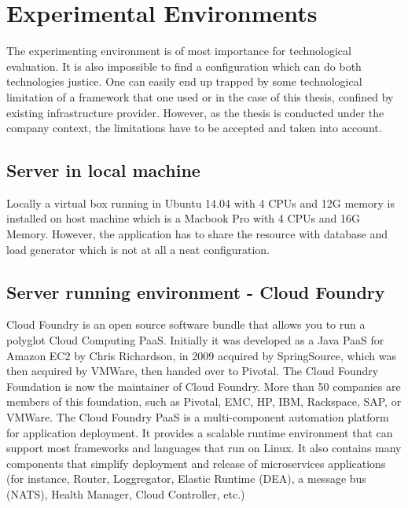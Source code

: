 \chapter{Experimental Environments}

The experimenting environment is of most importance for technological evaluation. It is also impossible to find a configuration which can do both technologies justice. One can easily end up trapped by some technological limitation of a framework that one used or in the case of this thesis, confined by existing infrastructure provider. However, as the thesis is conducted under the company context, the limitations have to be accepted and taken into account. 

\section{Server in local machine}
Locally a virtual box running in Ubuntu 14.04 with 4 CPUs and 12G memory is installed on host machine which is a Macbook  Pro with 4 CPUs and 16G Memory. However, the application has to share the resource with database and load generator which is not at all a neat configuration. 

\section{Server running environment -  Cloud Foundry}
Cloud Foundry is an open source software bundle that allows you to run a polyglot Cloud Computing \ac{PaaS}. Initially it was developed as a Java \ac{PaaS} for Amazon EC2 by Chris Richardson, in 2009 acquired by SpringSource, which was then acquired by VMWare, then handed over to Pivotal.
The Cloud Foundry Foundation  \citep{Pivotal}  is now the maintainer of Cloud Foundry. More than 50 companies are members of this foundation, such as Pivotal, EMC, HP, IBM, Rackspace, SAP, or VMWare.
The Cloud Foundry PaaS is a multi-component automation platform for application deployment. It provides a scalable runtime environment that can support most frameworks and languages that run on Linux. It also contains many components that simplify deployment and release of microservices applications (for instance, Router, Loggregator, Elastic Runtime (\ac{DEA}), a message bus (NATS), Health Manager, Cloud Controller, etc.)

